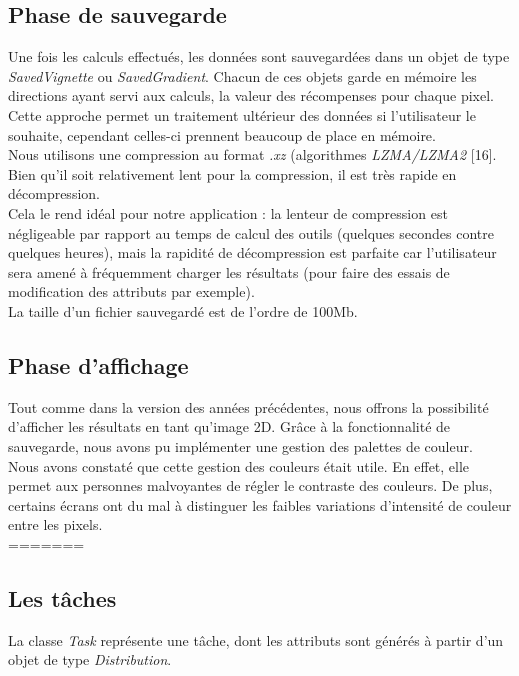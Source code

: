 \documentclass[12pt]{article}
\begin{document}
\subsection{Phase de sauvegarde}

Une fois les calculs effectués, les données sont sauvegardées dans un objet de type \emph{SavedVignette} ou \emph{SavedGradient}. Chacun de ces objets garde en mémoire les directions ayant servi aux calculs, la valeur des récompenses pour chaque pixel. \\

Cette approche permet un traitement ultérieur des données si l'utilisateur le souhaite, cependant celles-ci prennent beaucoup de place en mémoire. \\

Nous utilisons une compression au format \emph{.xz} (algorithmes \emph{LZMA/LZMA2} [16]. Bien qu'il soit relativement lent pour la compression, il est très rapide en décompression. \\

Cela le rend idéal pour notre application : la lenteur de compression est négligeable par rapport au temps de calcul des outils (quelques secondes contre quelques heures), mais la rapidité de décompression est parfaite car l'utilisateur sera amené à fréquemment charger les résultats (pour faire des essais de modification des attributs par exemple). \\

La taille d'un fichier sauvegardé est de l'ordre de 100Mb. \\

\subsection{Phase d'affichage}
\label{sec:affichage}

Tout comme dans la version des années précédentes, nous offrons la possibilité d'afficher les résultats en tant qu'image 2D. Grâce à la fonctionnalité de sauvegarde, nous avons pu implémenter une gestion des palettes de couleur. \\

Nous avons constaté que cette gestion des couleurs était utile. En effet, elle permet aux personnes malvoyantes de régler le contraste des couleurs. De plus, certains écrans ont du mal à distinguer les faibles variations d'intensité de couleur entre les pixels. \\
=======

\subsection{Les tâches}
La classe \emph{Task} représente une tâche, dont les attributs sont générés à partir d'un objet de type \emph{Distribution}. \\
\end{document}
